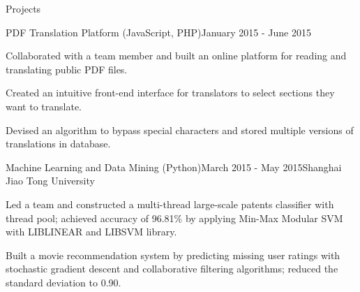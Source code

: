 \documentclass{resume} %
\begin{document}
\begin{rSection}{Projects}
%
\begin{rSubsection}{PDF Translation Platform (JavaScript, PHP)}{January 2015 - June 2015}{}{}
\item Collaborated with a team member and built an online platform for reading and translating public PDF files.
\item Created an intuitive front-end interface for translators to select sections they want to translate.
\item Devised an algorithm to bypass special characters and stored multiple versions of translations in database.
\end{rSubsection}

\begin{rSubsection}{Machine Learning and Data Mining (Python)}{March 2015 - May 2015}{}{Shanghai Jiao Tong University}
\item Led a team and constructed a multi-thread large-scale patents classifier with thread pool; achieved accuracy of 96.81\% by applying Min-Max Modular SVM with LIBLINEAR and LIBSVM library.
\item Built a movie recommendation system by predicting missing user ratings with stochastic gradient descent and collaborative filtering algorithms; reduced the standard deviation to 0.90.
\end{rSubsection}


\end{rSection}
\end{document}
